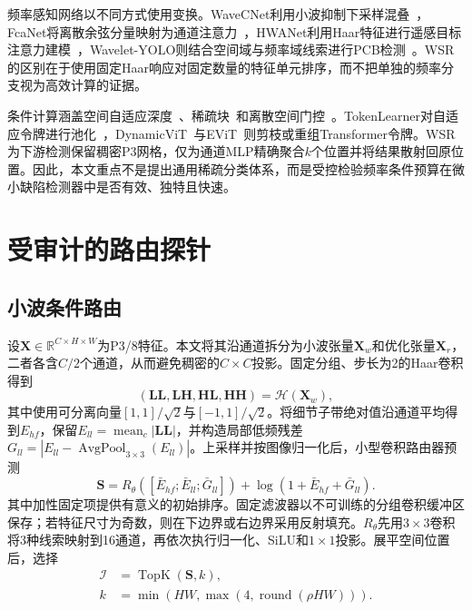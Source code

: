 \documentclass[conference]{IEEEtran}
\begin{document}
频率感知网络以不同方式使用变换。WaveCNet利用小波抑制下采样混叠~\cite{wavecnet}，FcaNet将离散余弦分量映射为通道注意力~\cite{fcanet}，HWANet利用Haar特征进行遥感目标注意力建模~\cite{hwanet}，Wavelet-YOLO则结合空间域与频率域线索进行PCB检测~\cite{waveletyolo}。WSR的区别在于使用固定Haar响应对固定数量的特征单元排序，而不把单独的频率分支视为高效计算的证据。

条件计算涵盖空间自适应深度~\cite{sact}、稀疏块~\cite{sbnet}和离散空间门控~\cite{dynamicconv}。TokenLearner对自适应令牌进行池化~\cite{tokenlearner}，DynamicViT~\cite{dynamicvit}与EViT~\cite{evit}则剪枝或重组Transformer令牌。WSR为下游检测保留稠密P3网格，仅为通道MLP精确聚合$k$个位置并将结果散射回原位置。因此，本文重点不是提出通用稀疏分类体系，而是受控检验频率条件预算在微小缺陷检测器中是否有效、独特且快速。

\section{受审计的路由探针}
\subsection{小波条件路由}
设$\mathbf X\in\mathbb R^{C\times H\times W}$为P3/8特征。本文将其沿通道拆分为小波张量$\mathbf X_w$和优化张量$\mathbf X_r$，二者各含$C/2$个通道，从而避免稠密的$C\times C$投影。固定分组、步长为2的Haar卷积得到
\begin{equation}
(\mathbf{LL},\mathbf{LH},\mathbf{HL},\mathbf{HH})=\mathcal H(\mathbf X_w),
\end{equation}
其中使用可分离向量$[1,1]/\sqrt2$与$[-1,1]/\sqrt2$。将细节子带绝对值沿通道平均得到$E_{hf}$，保留$E_{ll}=\operatorname{mean}_c|\mathbf{LL}|$，并构造局部低频残差$G_{ll}=|E_{ll}-\operatorname{AvgPool}_{3\times3}(E_{ll})|$。上采样并按图像归一化后，小型卷积路由器预测
\begin{equation}
\mathbf S=R_\theta([\bar E_{hf};\bar E_{ll};\bar G_{ll}])
+\log(1+\bar E_{hf}+\bar G_{ll}).
\end{equation}
其中加性固定项提供有意义的初始排序。固定滤波器以不可训练的分组卷积缓冲区保存；若特征尺寸为奇数，则在下边界或右边界采用反射填充。$R_\theta$先用$3\times3$卷积将3种线索映射到16通道，再依次执行归一化、SiLU和$1\times1$投影。展平空间位置后，选择
\begin{equation}
\begin{aligned}
\mathcal I&=\operatorname{TopK}(\mathbf S,k),\\
k&=\min(HW,\max(4,\operatorname{round}(\rho HW))).
\end{aligned}
\end{equation}
\end{document}
